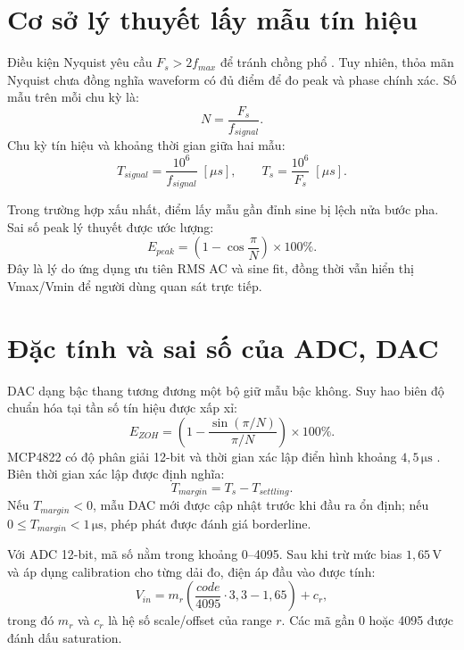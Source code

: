 \documentclass[12pt,a4paper]{report}
\newcommand{\unit}[1]{\,\mathrm{#1}}
\begin{document}
\section{Cơ sở lý thuyết lấy mẫu tín hiệu}
Điều kiện Nyquist yêu cầu $F_s>2f_{max}$ để tránh chồng phổ \cite{oppenheim}. Tuy nhiên, thỏa mãn Nyquist chưa đồng nghĩa waveform có đủ điểm để đo peak và phase chính xác. Số mẫu trên mỗi chu kỳ là:
\begin{equation}
N=\frac{F_s}{f_{signal}}.
\end{equation}
Chu kỳ tín hiệu và khoảng thời gian giữa hai mẫu:
\begin{equation}
T_{signal}=\frac{10^6}{f_{signal}}\;[\mu s],\qquad
T_s=\frac{10^6}{F_s}\;[\mu s].
\end{equation}

Trong trường hợp xấu nhất, điểm lấy mẫu gần đỉnh sine bị lệch nửa bước pha. Sai số peak lý thuyết được ước lượng:
\begin{equation}
E_{peak}=\left(1-\cos\frac{\pi}{N}\right)\times100\%.
\end{equation}
Đây là lý do ứng dụng ưu tiên RMS AC và sine fit, đồng thời vẫn hiển thị Vmax/Vmin để người dùng quan sát trực tiếp.

\section{Đặc tính và sai số của ADC, DAC}
DAC dạng bậc thang tương đương một bộ giữ mẫu bậc không. Suy hao biên độ chuẩn hóa tại tần số tín hiệu được xấp xỉ:
\begin{equation}
E_{ZOH}=\left(1-\frac{\sin(\pi/N)}{\pi/N}\right)\times100\%.
\end{equation}
MCP4822 có độ phân giải 12-bit và thời gian xác lập điển hình khoảng $4{,}5\unit{\mu s}$ \cite{mcp4822}. Biên thời gian xác lập được định nghĩa:
\begin{equation}
T_{margin}=T_s-T_{settling}.
\end{equation}
Nếu $T_{margin}<0$, mẫu DAC mới được cập nhật trước khi đầu ra ổn định; nếu $0\leq T_{margin}<1\unit{\mu s}$, phép phát được đánh giá borderline.

Với ADC 12-bit, mã số nằm trong khoảng 0--4095. Sau khi trừ mức bias $1{,}65\unit{V}$ và áp dụng calibration cho từng dải đo, điện áp đầu vào được tính:
\begin{equation}
V_{in}=m_r\left(\frac{code}{4095}\cdot3{,}3-1{,}65\right)+c_r,
\end{equation}
trong đó $m_r$ và $c_r$ là hệ số scale/offset của range $r$. Các mã gần 0 hoặc 4095 được đánh dấu saturation.
\end{document}
